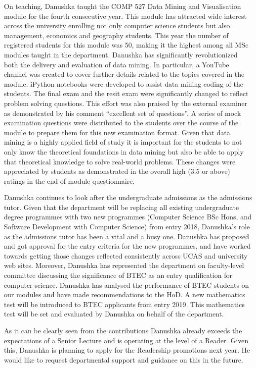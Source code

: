 On teaching, Danushka taught the COMP 527 Data Mining and Visualisation module for the fourth consecutive year. This module has attracted wide interest across the university enrolling not only computer science students but also management, economics and geography students. This year the number of registered students for this module was 50, making it the highest among all MSc modules taught in the department. Danushka has significantly revolutionized both the delivery and evaluation of data mining. In particular, a YouTube channel was created to cover further details related to the topics covered in the module. iPython notebooks were developed to assist data mining coding of the students. The final exam and the resit exam were significantly changed to reflect problem solving questions. This effort was also praised by the external examiner as demonstrated by his comment “excellent set of questions”. A series of mock examination questions were distributed to the students over the course of the module to prepare them for this new examination format. Given that data mining is a highly applied field of study it is important for the students to not only know the theoretical foundations in data mining but also be able to apply that theoretical knowledge to solve real-world problems. These changes were appreciated by students as demonstrated in the overall high (3.5 or above) ratings in the end of module questionnaire. 

Danushka continues to look after the undergraduate admissions as the admissions tutor. Given that the department will be replacing all existing undergraduate degree programmes with two new programmes (Computer Science BSc Hons, and Software Development with Computer Science) from entry 2018, Danushka’s role as the admissions tutor has been a vital and a busy one. Danushka has proposed and got approval for the entry criteria for the new programmes, and have worked towards getting those changes reflected consistently across UCAS and university web sites. Moreover, Danushka has represented the department on faculty-level committee discussing the significance of BTEC as an entry qualification for computer science. Danushka has analysed the performance of BTEC students on our modules and have made recommendations to the HoD. A new mathematics test will be introduced to BTEC applicants from entry 2019. This mathematics test will be set and evaluated by Danushka on behalf of the department.

As it can be clearly seen from the contributions Danushka already exceeds the expectations of a Senior Lecture and is operating at the level of a Reader. Given this, Danushka is planning to apply for the Readership promotions next year. He would like to request departmental support and guidance on this in the future. 

